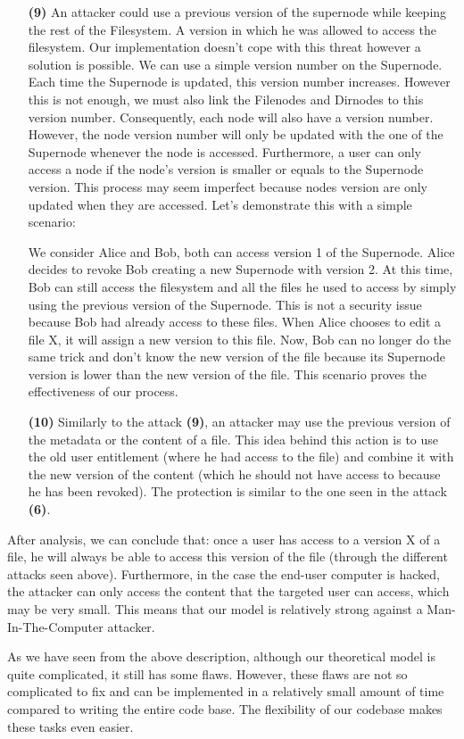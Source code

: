 \documentclass[../main.tex]{subfiles}
\begin{document}
\begin{itemize}
    \item[\textbf{(9)}] An attacker could use a previous version of the supernode while keeping the rest of the Filesystem. A version in which he was allowed to access the filesystem. Our implementation doesn't cope with this threat however a solution is possible. We can use a simple version number on the Supernode. Each time the Supernode is updated, this version number increases. However this is not enough, we must also link the Filenodes and Dirnodes to this version number. Consequently, each node will also have a version number. However, the node version number will only be updated with the one of the Supernode whenever the node is accessed. Furthermore, a user can only access a node if the node's version is smaller or equals to the Supernode version. This process may seem imperfect because nodes version are only updated when they are accessed. Let's demonstrate this with a simple scenario:
    \par We consider Alice and Bob, both can access version 1 of the Supernode. Alice decides to revoke Bob creating a new Supernode with version 2. At this time, Bob can still access the filesystem and all the files he used to access by simply using the previous version of the Supernode. This is not a security issue because Bob had already access to these files. When Alice chooses to edit a file X, it will assign a new version to this file. Now, Bob can no longer do the same trick and don't know the new version of the file because its Supernode version is lower than the new version of the file. This scenario proves the effectiveness of our process.
    \item[\textbf{(10)}] Similarly to the attack \textbf{(9)}, an attacker may use the previous version of the metadata or the content of a file. This idea behind this action is to use the old user entitlement (where he had access to the file) and combine it with the new version of the content (which he should not have access to because he has been revoked). The protection is similar to the one seen in the attack \textbf{(6)}.
\end{itemize}

\par After analysis, we can conclude that: once a user has access to a version X of a file, he will always be able to access this version of the file (through the different attacks seen above). Furthermore, in the case the end-user computer is hacked, the attacker can only access the content that the targeted user can access, which may be very small. This means that our model is relatively strong against a Man-In-The-Computer attacker.
\par As we have seen from the above description, although our theoretical model is quite complicated, it still has some flaws. However, these flaws are not so complicated to fix and can be implemented in a relatively small amount of time compared to writing the entire code base. The flexibility of our codebase makes these tasks even easier.
\end{document}

